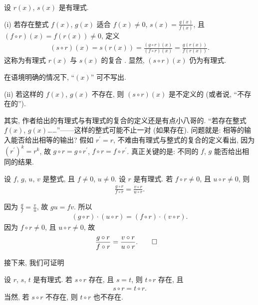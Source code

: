 \begin{definition}
    设 $r(x)$, $s(x)$ 是有理式.

    (i) 若存在整式 $f(x)$, $g(x)$ 适合 $f(x) \neq 0$, $s(x) = \frac{g(x)}{f(x)}$, 且 $(f \circ r)(x) = f(r(x)) \neq 0$, 定义
    \begin{align*}
        (s \circ r)(x) = s(r(x)) = \frac{(g \circ r)(x)}{(f \circ r)(x)} = \frac{g(r(x))}{f(r(x))}.
    \end{align*}
    这称为有理式 $r(x)$ 与 $s(x)$ 的复合 . 显然, $(s \circ r)(x)$ 仍为有理式.

    在语境明确的情况下, ``$(x)$'' 可不写出.

    (ii) 若这样的 $f(x)$, $g(x)$ 不存在, 则 $(s \circ r)(x)$ 是不定义的 (或者说, ``不存在的'').
\end{definition}

其实, 作者给出的有理式与有理式的复合的定义还是有点小八哥的. ``若存在整式 $f(x)$, $g(x)$……''——这样的整式可能不止一对 (如果存在). 问题就是: 相等的输入能否给出相等的输出? 假如 $r^{\prime} = r$, 不难由有理式与整式的复合的定义看出, 因为 $(r^{\prime})^k = r^k$, 故 $g \circ r = g \circ r^{\prime}$, $f \circ r = f \circ r^{\prime}$. 真正关键的是: 不同的 $f$, $g$ 能否给出相同的结果.

\begin{proposition}
    设 $f$, $g$, $u$, $v$ 是整式, 且 $f \neq 0$, $u \neq 0$. 设 $r$ 是有理式. 若 $f \circ r \neq 0$, 且 $u \circ r \neq 0$, 则
    \begin{align*}
        \frac{g \circ r}{f \circ r} = \frac{v \circ r}{u \circ r}.
    \end{align*}
\end{proposition}

\begin{pf}
    因为 $\frac{g}{f} = \frac{v}{u}$, 故 $gu = fv$. 所以
    \begin{align*}
        (g \circ r) \cdot (u \circ r) = (f \circ r) \cdot (v \circ r).
    \end{align*}
    因为 $f \circ r \neq 0$, 且 $u \circ r \neq 0$, 故
    \begin{align*}
         & \frac{g \circ r}{f \circ r} = \frac{v \circ r}{u \circ r}. \qedhere
    \end{align*}
\end{pf}

接下来, 我们可证明
\begin{proposition}
    设 $r$, $s$, $t$ 是有理式. 若 $s \circ r$ 存在, 且 $s = t$, 则 $t \circ r$ 存在, 且
    \begin{align*}
        s \circ r = t \circ r.
    \end{align*}
    当然, 若 $s \circ r$ 不存在, 则 $t \circ r$ 也不存在.
\end{proposition}

